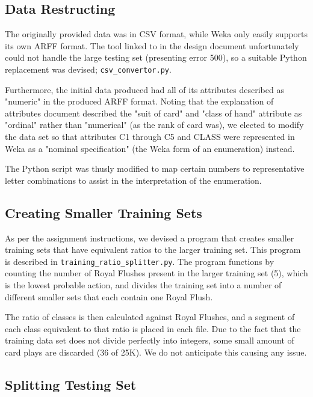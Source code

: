 \documentclass[11pt, a4paper]{article}
\begin{document}
\subsection*{Data Restructing}

The originally provided data was in CSV format, while Weka only easily supports its own ARFF format. The tool linked to in the design document \cite{arffconv} unfortunately could not handle the large testing set (presenting error 500), so a suitable Python replacement was devised; \texttt{csv_convertor.py}.

Furthermore, the initial data produced had all of its attributes described as "numeric" in the produced ARFF format. Noting that the explanation of attributes document \cite{expattr} described the "suit of card" and "class of hand" attribute as "ordinal" rather than "numerical" (as the rank of card was), we elected to modify the data set so that attributes C1 through C5 and CLASS were represented in Weka as a "nominal specification" (the Weka form of an enumeration) instead.

The Python script was thusly modified to map certain numbers to representative letter combinations to assist in the interpretation of the enumeration.

\subsection*{Creating Smaller Training Sets}

As per the assignment instructions, we devised a program that creates smaller training sets that have equivalent ratios to the larger training set. This program is described in \texttt{training_ratio_splitter.py}. The program functions by counting the number of Royal Flushes present in the larger training set (5), which is the lowest probable action, and divides the training set into a number of different smaller sets that each contain one Royal Flush.

The ratio of classes is then calculated against Royal Flushes, and a segment of each class equivalent to that ratio is placed in each file. Due to the fact that the training data set does not divide perfectly into integers, some small amount of card plays are discarded (36 of 25K). We do not anticipate this causing any issue.

\subsection*{Splitting Testing Set}
\end{document}
